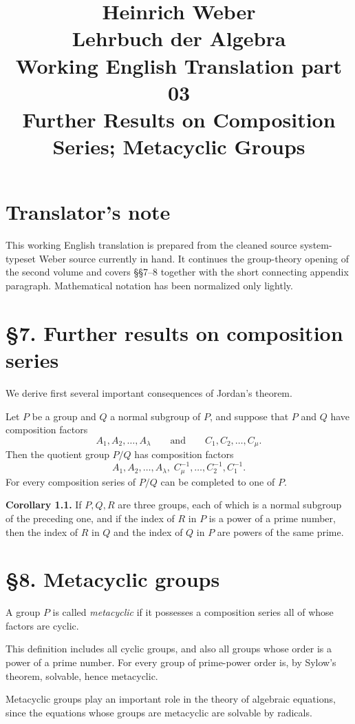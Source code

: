 \documentclass[11pt]{article}
\title{Heinrich Weber\\Lehrbuch der Algebra\\Working English Translation part 03\\Further Results on Composition Series; Metacyclic Groups}
\author{}
\date{}
\begin{document}
\maketitle

\section*{Translator's note}
This working English translation is prepared from the cleaned source system-typeset Weber source currently in hand. It continues the group-theory opening of the second volume and covers \S\S 7--8 together with the short connecting appendix paragraph. Mathematical notation has been normalized only lightly.

\section*{\S 7. Further results on composition series}

We derive first several important consequences of Jordan's theorem.

Let $P$ be a group and $Q$ a normal subgroup of $P$, and suppose that $P$ and $Q$ have composition factors
\[
A_1,A_2,\dots,A_\lambda
\qquad\text{and}\qquad
C_1,C_2,\dots,C_\mu.
\]
Then the quotient group $P/Q$ has composition factors
\[
A_1,A_2,\dots,A_\lambda,\; C_\mu^{-1},\dots,C_2^{-1},C_1^{-1}.
\]
For every composition series of $P/Q$ can be completed to one of $P$.

\medskip
\noindent\textbf{Corollary 1.1.}
If $P,Q,R$ are three groups, each of which is a normal subgroup of the preceding one, and if the index of $R$ in $P$ is a power of a prime number, then the index of $R$ in $Q$ and the index of $Q$ in $P$ are powers of the same prime.

\section*{\S 8. Metacyclic groups}

A group $P$ is called \emph{metacyclic} if it possesses a composition series all of whose factors are cyclic.

This definition includes all cyclic groups, and also all groups whose order is a power of a prime number. For every group of prime-power order is, by Sylow's theorem, solvable, hence metacyclic.

Metacyclic groups play an important role in the theory of algebraic equations, since the equations whose groups are metacyclic are solvable by radicals.
\end{document}
